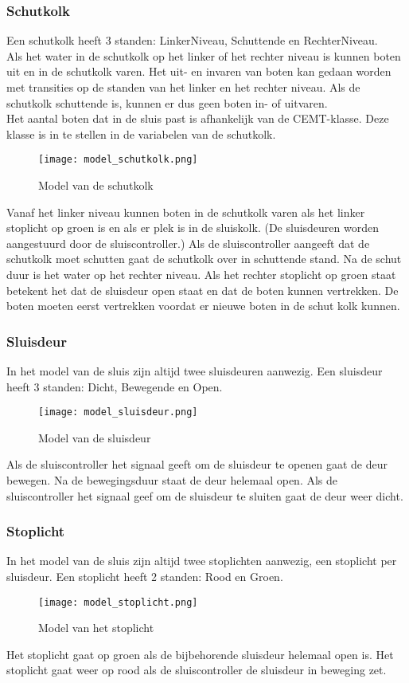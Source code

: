 \documentclass[../verslag.tex]{subfiles}
\begin{document}
\subsubsection{Schutkolk}
Een schutkolk heeft 3 standen: LinkerNiveau, Schuttende en RechterNiveau.\\
Als het water in de schutkolk op het linker of het rechter niveau is kunnen boten uit en in de schutkolk varen. Het uit- en invaren van boten kan gedaan worden met transities op de standen van het linker en het rechter niveau. Als de schutkolk schuttende is, kunnen er dus geen boten in- of uitvaren.\\
Het aantal boten dat in de sluis past is afhankelijk van de CEMT-klasse. Deze klasse is in te stellen in de variabelen van de schutkolk.
\begin{figure}[H]
    \centering
    \texttt{[image: model\_schutkolk.png]}
    \caption{Model van de schutkolk}
\end{figure}
Vanaf het linker niveau kunnen boten in de schutkolk varen als het linker stoplicht op groen is en als er plek is in de sluiskolk. (De sluisdeuren worden aangestuurd door de sluiscontroller.) Als de sluiscontroller aangeeft dat de schutkolk moet schutten gaat de schutkolk over in schuttende stand. Na de schut duur is het water op het rechter niveau. Als het rechter stoplicht op groen staat betekent het dat de sluisdeur open staat en dat de boten kunnen vertrekken. De boten moeten eerst vertrekken voordat er nieuwe boten in de schut kolk kunnen.

\subsubsection{Sluisdeur}
In het model van de sluis zijn altijd twee sluisdeuren aanwezig.
Een sluisdeur heeft 3 standen: Dicht, Bewegende en Open.
\begin{figure}[H]
    \centering
    \texttt{[image: model\_sluisdeur.png]}
    \caption{Model van de sluisdeur}
\end{figure}
Als de sluiscontroller het signaal geeft om de sluisdeur te openen gaat de deur bewegen. Na de bewegingsduur staat de deur helemaal open. Als de sluiscontroller het signaal geef om de sluisdeur te sluiten gaat de deur weer dicht.

\subsubsection{Stoplicht}
In het model van de sluis zijn altijd twee stoplichten aanwezig, een stoplicht per sluisdeur.
Een stoplicht heeft 2 standen: Rood en Groen.
\begin{figure}[H]
    \centering
    \texttt{[image: model\_stoplicht.png]}
    \caption{Model van het stoplicht}
\end{figure}
Het stoplicht gaat op groen als de bijbehorende sluisdeur helemaal open is. Het stoplicht gaat weer op rood als de sluiscontroller de sluisdeur in beweging zet.
\end{document}
